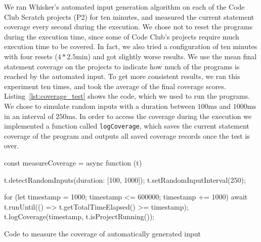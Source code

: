 We ran Whisker's automated input generation algorithm on each of the Code Club Scratch projects (P2) for ten minutes,
and measured the current statement coverage every second during the execution.
We chose not to reset the programs during the execution time,
since some of Code Club's projects require much execution time to be covered.
In fact, we also tried a configuration of ten minutes with four resets ($4 * 2.5\text{min}$)
and got slightly worse results.
We use the mean final statement coverage on the projects to indicate how much of the programs is reached by the automated input.
To get more consistent results, we ran this experiment ten times, and took the average of the final coverage scores.
Listing~\ref{lst:coverage_test} shows the code, which we used to run the programs.
We chose to simulate random inputs with a duration between $100\text{ms}$ and $1000\text{ms}$ in an interval of $250\text{ms}$.
In order to access the coverage during the execution we implemented a function called \texttt{logCoverage},
which saves the current statement coverage of the program and outputs all saved coverage records once the test is over.
\parspace


\begin{listing}[ht]
    \centering

    \begin{minipage}{.9\textwidth}
        \begin{javascriptcode}
            const measureCoverage = async function (t) {
                t.detectRandomInputs({duration: [100, 1000]});
                t.setRandomInputInterval(250);

                for (let timestamp = 1000; timestamp <= 600000; timestamp += 1000) {
                    await t.runUntil(() => t.getTotalTimeElapsed() >= timestamp);
                    t.logCoverage(timestamp, t.isProjectRunning());
                }
            }
        \end{javascriptcode}
    \end{minipage}

    \caption{Code to measure the coverage of automatically generated input}
    \label{lst:coverage_test}
\end{listing}

